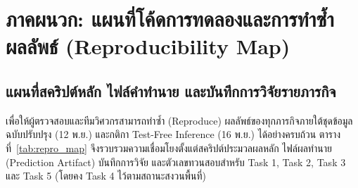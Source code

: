\clearpage
\appendix
\section{ภาคผนวก: แผนที่โค้ดการทดลองและการทำซ้ำผลลัพธ์ (Reproducibility Map)}
\label{sec:appendix}

\subsection{แผนที่สคริปต์หลัก ไฟล์คำทำนาย และบันทึกการวิจัยรายภารกิจ}
\label{subsec:repro_map}

เพื่อให้ผู้ตรวจสอบและทีมวิศวกรสามารถทำซ้ำ (Reproduce) ผลลัพธ์ของทุกภารกิจภายใต้ชุดข้อมูลฉบับปรับปรุง (12 พ.ย.) และกติกา Test-Free Inference (16 พ.ย.) ได้อย่างครบถ้วน ตารางที่~\ref{tab:repro_map} จึงรวบรวมความเชื่อมโยงตั้งแต่สคริปต์ประมวลผลหลัก ไฟล์ผลทำนาย (Prediction Artifact) บันทึกการวิจัย และตัวเลขทวนสอบสำหรับ Task 1, Task 2, Task 3 และ Task 5 (โดยคง Task 4 ไว้ตามสถานะสงวนพื้นที่)

